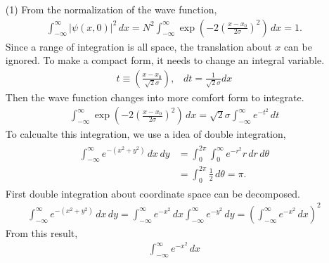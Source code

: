 \documentclass[floatfix,nofootinbib,superscriptaddress,fleqn]{revtex4}
\begin{document}
\begin{itemize}
  \item[(1)] From the normalization of the wave function,
  \begin{align*}
    \int_{-\infty}^{\infty} |\psi(x,0)|^2\,dx=N^2\int_{-\infty}^{\infty}
    \exp\left(-2{\left(\frac{x-x_0}{2\sigma}\right)}^2\right) \,dx =1.
  \end{align*}
Since a range of integration is all space, the translation 
about $x$ can be ignored.
To make a compact form, it needs to change an integral variable.
  \begin{align*}
    t \equiv \left(\frac{x-x_0}{\sqrt{2}\sigma}\right),\;\;\; dt 
    = \frac{1}{\sqrt{2}\sigma} dx 
  \end{align*}
Then the wave function changes into more comfort form to integrate.
  \begin{align}\label{eq:gt}
    \int_{-\infty}^{\infty}\exp\left(-2{\left(
      \frac{x-x_0}{2\sigma}\right)}^2\right) \,dx
    =\sqrt{2}\sigma \int_{-\infty}^{\infty} e^{-t^2} \,dt
  \end{align}
To calcualte this integration, we use a idea of double integration,
  \begin{align*}
    \begin{split} 
      \int_{-\infty}^{\infty} e^{-(x^2+y^2)}\,dx\,dy 
      &= \int_{0}^{2\pi}\int_{0}^{\infty} e^{-r^2}r\,dr\,d\theta
      \\   &= \int_{0}^{2\pi}\frac{1}{2}\,d\theta = \pi.
    \end{split}
  \end{align*}
First double integration about coordinate space can be decomposed.
  \begin{align*}
    \int_{-\infty}^{\infty} e^{-(x^2+y^2)}\,dx\,dy 
    = \int_{-\infty}^{\infty} e^{-x^2}\,dx\int_{-\infty}^{\infty}e^{-y^2}\,dy
    = \left(\int_{-\infty}^{\infty} e^{-x^2}\,dx\right)^2
  \end{align*}
From this result,
  \begin{align*}
    \int_{-\infty}^{\infty} e^{-x^2} \,dx 

\end{align*}
\end{itemize}
\end{document}
